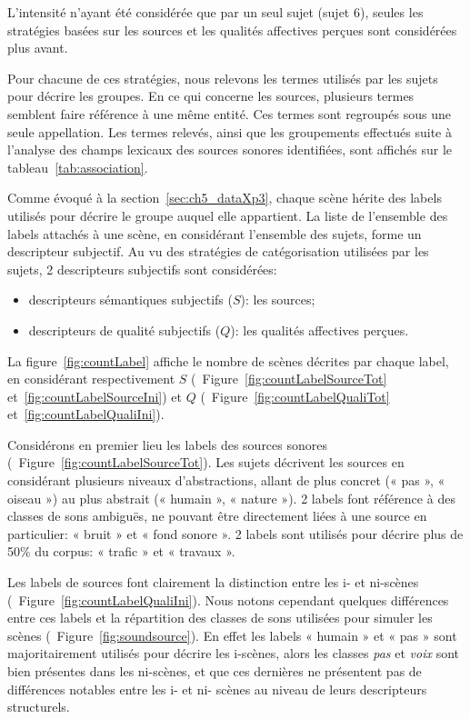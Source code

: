 L'intensité n'ayant été considérée que par un seul sujet (sujet 6), seules les stratégies basées sur les sources et les qualités affectives perçues sont considérées plus avant.

Pour chacune de ces stratégies, nous relevons les termes utilisés par les sujets pour décrire les groupes. En ce qui concerne les sources, plusieurs termes semblent faire référence à une même entité. Ces termes sont regroupés sous une seule appellation. Les termes relevés, ainsi que les groupements effectués suite à l'analyse des champs lexicaux des sources sonores identifiées, sont affichés sur le tableau~\ref{tab:association}.

Comme évoqué à la section~\ref{sec:ch5_dataXp3}, chaque scène hérite des labels utilisés pour décrire le groupe auquel elle appartient. La liste de l'ensemble des labels attachés à une scène, en considérant l'ensemble des sujets, forme un descripteur subjectif. Au vu des stratégies de catégorisation utilisées par les sujets, 2 descripteurs subjectifs sont considérées:

\begin{itemize}
\item descripteurs sémantiques subjectifs ($S$): les sources;
\item descripteurs de qualité subjectifs ($Q$): les qualités affectives perçues.
\end{itemize}

La figure~\ref{fig:countLabel} affiche le nombre de scènes décrites par chaque label, en considérant respectivement $S$ (\cf~Figure~\ref{fig:countLabelSourceTot} et~\ref{fig:countLabelSourceIni}) et $Q$ (\cf~Figure~\ref{fig:countLabelQualiTot} et~\ref{fig:countLabelQualiIni}).

Considérons en premier lieu les labels des sources sonores (\cf~Figure~\ref{fig:countLabelSourceTot}). Les sujets décrivent les sources en considérant plusieurs niveaux d'abstractions, allant de plus concret (« pas », « oiseau ») au plus abstrait (« humain », « nature »). 2 labels font référence à des classes de sons ambiguës, ne pouvant être directement liées à une source en particulier: « bruit » et « fond sonore ». 2 labels sont utilisés pour décrire plus de 50\% du corpus: « trafic » et « travaux ». 

Les labels de sources font clairement la distinction entre les i- et ni-scènes (\cf~Figure~\ref{fig:countLabelQualiIni}). Nous notons cependant quelques différences entre ces labels et la répartition des classes de sons utilisées pour simuler les scènes (\cf~Figure~\ref{fig:soundsource}).  En effet les labels « humain » et « pas » sont majoritairement utilisés pour décrire les i-scènes, alors les classes \emph{pas} et \emph{voix} sont bien présentes dans les ni-scènes, et que ces dernières ne présentent pas de différences notables entre les i- et ni- scènes au niveau de leurs descripteurs structurels. 

